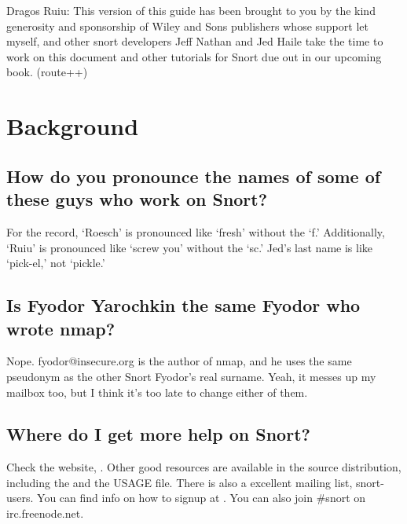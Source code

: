 \documentclass{article}
\begin{document}
Dragos Ruiu: This version of this guide has been brought to you by the kind
generosity and sponsorship of Wiley and Sons publishers whose support let
myself, and other snort developers Jeff Nathan and Jed Haile take the time to
work on this document and other tutorials for Snort due out in our upcoming
book. (route++)


\newpage

\begin{latexonly}
\tableofcontents

\newpage
\end{latexonly}

\section{Background}

\subsection{How do you pronounce the names of some of these guys who work on Snort?}

For the record, `Roesch' is pronounced like `fresh' without the `f.'  
Additionally, `Ruiu' is pronounced like `screw you' without the `sc.'  
Jed's last name is like `pick-el,' not `pickle.' 

\subsection{Is Fyodor Yarochkin the same Fyodor who wrote nmap?}

Nope. fyodor@insecure.org is the author of nmap, and he uses the same pseudonym as the other Snort Fyodor's real surname. Yeah, it messes up my mailbox too, but I think it's too late to change either of them.

\subsection{Where do I get more help on Snort?}

Check the website, .  Other good resources are available in the source distribution, including the  and the USAGE file. There is also a excellent mailing list, snort-users. You can find
info on how to signup at . You can also join 
\#snort on irc.freenode.net.
\end{document}
